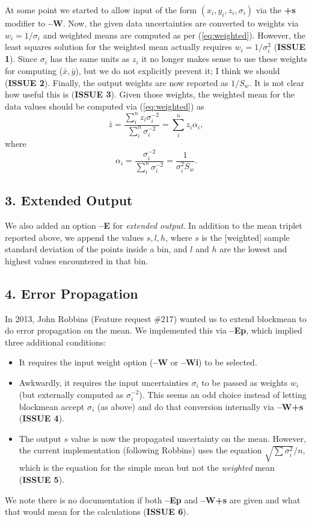 \documentclass[12pt,letterpaper,margin=0.5in]{report}
\begin{document}
At some point we started to allow input of the form  $(x_i,y_i,z_i,\sigma_i)$ via the {\bf +s} modifier to {\bf--W}. Now,
the given data uncertainties are converted to weights via $w_i = 1/\sigma_i$ and weighted means are computed
as per (\ref{eq:weighted}).  However, the least squares solution for the weighted mean actually requires $w_i = 1/\sigma_i^2$
({\bf ISSUE 1}). Since $\sigma_i$ has the same units as $z_i$ it no longer makes sense to use these weights
for computing ($\bar{x}, \bar{y}$), but we do not explicitly prevent it; I think we should ({\bf ISSUE 2}).
Finally, the output weights are now reported as $1/S_w$.  It is not clear how useful this is ({\bf ISSUE 3}).
Given those weights, the weighted mean for the data values should be computed via (\ref{eq:weighted}) as
\begin{equation}
	\bar{z} = \frac{\sum_i^n z_i \sigma_i^{-2}}{\sum_i^n \sigma_i^{-2}} = \sum_i^n z_i \alpha_i,
	\label{eq:w}
\end{equation}
where
\begin{equation}
	\alpha_i = \frac{ \sigma_i^{-2}}{\sum_i^n \sigma_i^{-2}} = \frac{1}{\sigma_i^2 S_w}.
	\label{eq:a}
\end{equation}


\subsection*{3. Extended Output}

We also added an option {\bf --E} for \emph{extended output}.  In addition to the mean triplet reported above, we append
the values $s, l, h$, where $s$ is the [weighted] sample standard deviation of the points inside a bin, and $l$ and
$h$ are the lowest and highest values encountered in that bin.

\subsection*{4. Error Propagation}

In 2013, John Robbins (Feature request \#217) wanted us to extend blockmean to do error propagation on the mean.  We implemented
this via {\bf --Ep}, which implied three additional conditions:
\begin{itemize}
	\item It requires the input weight option ({\bf --W} or {\bf --Wi}) to be selected.
	\item Awkwardly, it requires the input uncertainties $\sigma_i$ to be passed as weights $w_i$ (but externally computed as $\sigma_i^{-2}$).
		This seems an odd choice instead of letting blockmean accept $\sigma_i$ (as above) and do that conversion internally via {\bf --W+s} ({\bf ISSUE 4}).
	\item The output $s$ value is now the propagated uncertainty on the mean.  However, the current implementation (following Robbins)
		uses the equation $\sqrt{\sum \sigma_i^2}/n$, which is the equation for the simple mean but not the \emph{weighted} mean ({\bf ISSUE 5}).
\end{itemize}
We note there is no documentation if both {\bf --Ep} and {\bf --W+s} are given and what that would mean for the calculations ({\bf ISSUE 6}).
\end{document}
